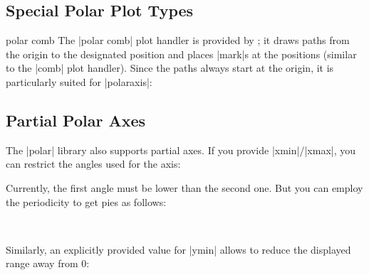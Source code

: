 {\subsection{Special Polar Plot Types}
\begin{plottype}{polar comb}
	The |polar comb| plot handler is provided by \Tikz; it draws paths from the origin to the designated position and places |mark|s at the positions (similar to the |comb| plot handler). Since the paths always start at the origin, it is particularly suited for |polaraxis|:
\begin{codeexample}[]
\end{codeexample}
\end{plottype}

\subsection{Partial Polar Axes}
The |polar| library also supports partial axes. If you provide |xmin|/|xmax|, you can restrict the angles used for the axis:
\begin{codeexample}[]
\end{codeexample}

Currently, the first angle must be lower than the second one. But you can employ the periodicity to get pies as follows:
%
\begin{codeexample}[]
~%
\end{codeexample}
\noindent Similarly, an explicitly provided value for |ymin| allows to reduce the displayed range away from $0$:
\begin{codeexample}[]
\end{codeexample}

}
